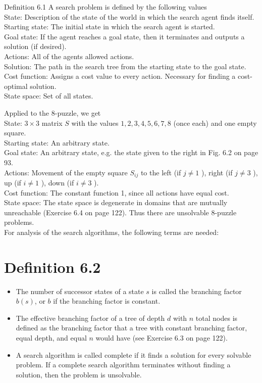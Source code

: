 \documentclass[10pt]{article}
\begin{document}
Definition 6.1 A search problem is defined by the following values\\
State: Description of the state of the world in which the search agent finds itself.\\
Starting state: The initial state in which the search agent is started.\\
Goal state: If the agent reaches a goal state, then it terminates and outputs a solution (if desired).\\
Actions: All of the agents allowed actions.\\
Solution: The path in the search tree from the starting state to the goal state.\\
Cost function: Assigns a cost value to every action. Necessary for finding a cost-optimal solution.\\
State space: Set of all states.

Applied to the 8-puzzle, we get\\
State: $3 \times 3$ matrix $S$ with the values $1,2,3,4,5,6,7,8
$ (once each) and one empty square.\\
Starting state: An arbitrary state.\\
Goal state: An arbitrary state, e.g. the state given to the right in Fig. 6.2 on page 93.\\
Actions: Movement of the empty square $S_{i j}$ to the left (if $j \neq 1$ ), right (if $j \neq 3$ ), up (if $i \neq 1$ ), down (if $i \neq 3$ ).\\
Cost function: The constant function 1, since all actions have equal cost.\\
State space: The state space is degenerate in domains that are mutually unreachable (Exercise 6.4 on page 122). Thus there are unsolvable 8-puzzle problems.\\
For analysis of the search algorithms, the following terms are needed:

\section*{Definition 6.2}
\begin{itemize}
  \item The number of successor states of a state $s$ is called the branching factor $b(s)$, or $b$ if the branching factor is constant.
  \item The effective branching factor of a tree of depth $d$ with $n$ total nodes is defined as the branching factor that a tree with constant branching factor, equal depth, and equal $n$ would have (see Exercise 6.3 on page 122).
  \item A search algorithm is called complete if it finds a solution for every solvable problem. If a complete search algorithm terminates without finding a solution, then the problem is unsolvable.
\end{itemize}
\end{document}
